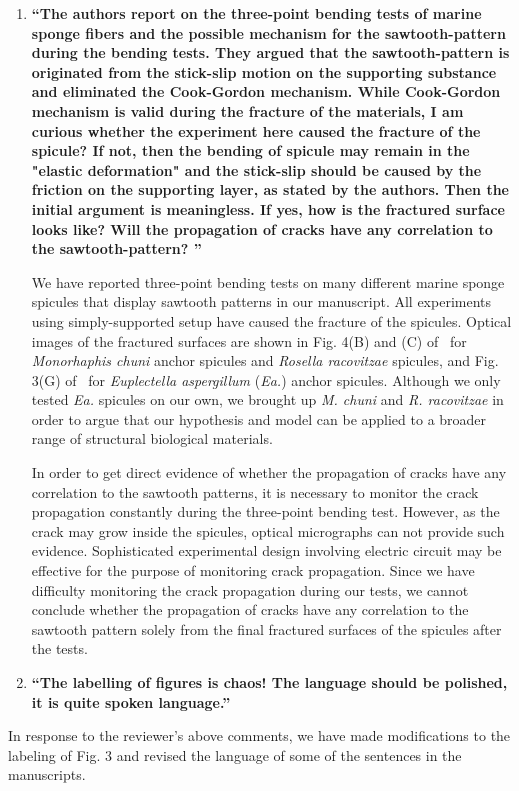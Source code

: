 \documentclass[11pt,letterpaper]{report}
\begin{document}
\begin{enumerate}[label=\textit{1.\arabic*},wide, labelwidth=!, labelindent=0pt]
\begin{enumerate}[label=\textit{2.\arabic*},wide, labelindent=0pt]

\item \label{r2c1}{\bf ``The authors report on the three-point bending tests of marine sponge fibers and the possible mechanism for the sawtooth-pattern during the bending tests. They argued that the sawtooth-pattern is originated from the stick-slip motion on the supporting substance and eliminated the Cook-Gordon mechanism. 
While Cook-Gordon mechanism is valid during the fracture of the materials, I am curious whether the experiment here caused the fracture of the spicule? 
If not, then the bending of spicule may remain in the "elastic deformation" and the stick-slip should be caused by the friction on the supporting layer, as stated by the authors. Then the initial argument is meaningless. 
If yes, how is the fractured surface looks like? Will the propagation of cracks have any correlation to the sawtooth-pattern? ''}


We have reported three-point bending tests on many different marine sponge spicules that display sawtooth patterns in our manuscript. All experiments using simply-supported setup have caused the fracture of the spicules.
Optical images of the fractured surfaces are shown in Fig. 4(B) and (C) of~\cite{kochiyama2021sawtooth} for \textit{Monorhaphis chuni} anchor spicules and \textit{Rosella racovitzae} spicules, and Fig. 3(G) of~\cite{monn2017enhanced} for \textit{Euplectella aspergillum} (\textit{Ea.}) anchor spicules. 
Although we only tested \textit{Ea.} spicules on our own, we brought up \textit{M. chuni} and \textit{R. racovitzae} in order to argue that our hypothesis and model can be applied to a broader range of structural biological materials. 

In order to get direct evidence of whether the propagation of cracks have any correlation to the sawtooth patterns, it is necessary to monitor the crack propagation constantly during the three-point bending test. However, as the crack may grow inside the spicules, optical micrographs can not provide such evidence. Sophisticated experimental design involving electric circuit may be effective for the purpose of monitoring crack propagation.
Since we have difficulty monitoring the crack propagation during our tests, we cannot conclude whether the propagation of cracks have any correlation to the sawtooth pattern solely from the final fractured surfaces of the spicules after the tests. 



\item \label{r2c2}{\bf ``The labelling of figures is chaos! The language should be polished, it is quite spoken language.''}
\end{enumerate}

In response to the reviewer's above comments, we have made modifications to the labeling of Fig. 3 and revised the language of some of the sentences in the manuscripts. 


\end{enumerate}

\clearpage



\end{document}
